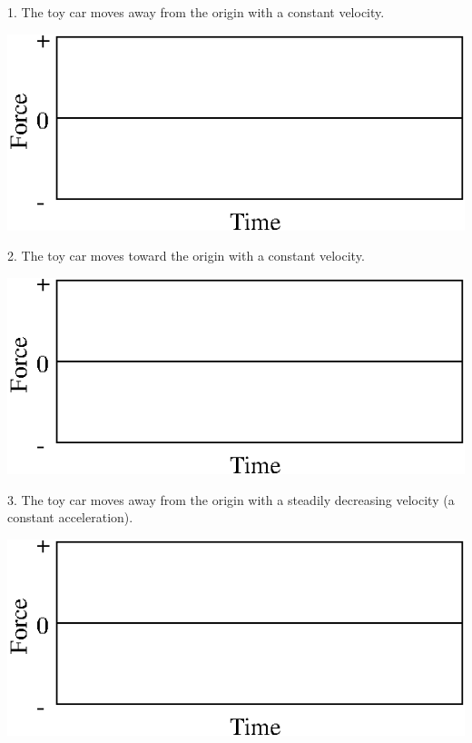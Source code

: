 1. The toy car moves away from the origin with a constant velocity.

\vspace{0.3cm}
{\par\centering \includegraphics{force2/force2_fig7.eps} \par}
\vspace{0.3cm}

2. The toy car moves toward the origin with a constant velocity.

\vspace{0.3cm}
{\par\centering \includegraphics{force2/force2_fig7.eps} \par}
\vspace{0.3cm}

3. The toy car moves away from the origin with a steadily decreasing velocity
(a constant acceleration).

\vspace{0.3cm}
{\par\centering \includegraphics{force2/force2_fig7.eps} \par}
\vspace{0.3cm}

